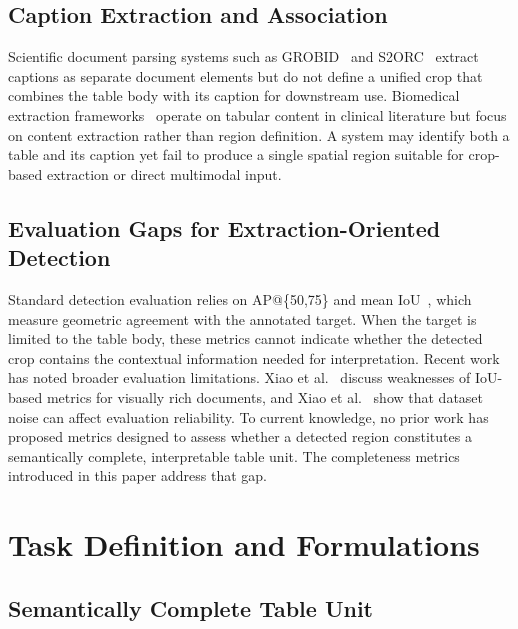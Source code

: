 \documentclass[pdflatex,sn-mathphys-num,iicol]{sn-jnl}
\begin{document}
\subsection{Caption Extraction and Association}\label{sec:related_caption}

Scientific document parsing systems such as GROBID~\cite{lopez2009grobid} and
S2ORC~\cite{lo2020s2orc} extract captions as separate document elements but do not
define a unified crop that combines the table body with its caption for downstream
use. Biomedical extraction frameworks~\cite{milosevic2019biomedical} operate on
tabular content in clinical literature but focus on content extraction rather than
region definition. A system may identify both a table and its caption yet fail to
produce a single spatial region suitable for crop-based extraction or direct
multimodal input.

\subsection{Evaluation Gaps for Extraction-Oriented Detection}\label{sec:related_evaluation}

Standard detection evaluation relies on AP@\{50,75\} and mean
IoU~\cite{lin2014coco}, which measure geometric agreement with the annotated target.
When the target is limited to the table body, these metrics cannot indicate whether
the detected crop contains the contextual information needed for interpretation.
Recent work has noted broader evaluation limitations. Xiao et
al.~\cite{xiao2023improved} discuss weaknesses of IoU-based metrics for visually
rich documents, and Xiao et al.~\cite{xiao2025revisiting} show that dataset noise
can affect evaluation reliability. To current knowledge, no prior work has proposed
metrics designed to assess whether a detected region constitutes a semantically
complete, interpretable table unit. The completeness metrics introduced in this
paper address that gap.

\section{Task Definition and Formulations}\label{sec:task}

\subsection{Semantically Complete Table Unit}\label{sec:definition}
\end{document}
